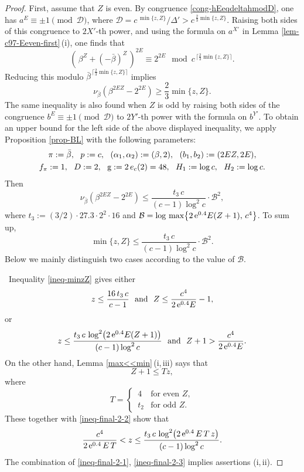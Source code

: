\documentclass[11pt]{amsart}
\numberwithin{equation}{section}
\begin{document}
\begin{proof}
First, assume that $Z$ is even.
By congruence \eqref{cong-hEeqdeltahmodD}, one has $a^E \equiv \pm1 \pmod{\mathcal D}$, where $\mathcal D=c^{\,\min\{z,Z\}}/\Delta'>c^{\,\frac{2}{3}\min\{z,Z\}}$.
Raising both sides of this congruence to $2X'$-th power, and using the formula on $a^{X'}$ in Lemma \ref{lem-c97-Eeven-first}\,(i), one finds that
\[
(\,\beta^Z+(-\bar{\beta})^Z\,)^{2E} \equiv 2^{2E} \mod{c^{\,\big\lceil\frac{2}{3}\min\{z,Z\}\big\rceil}}.
\]
Reducing this modulo $\bar{\beta}^{\,\big\lceil\frac{2}{3}\min\{z,Z\}\big\rceil}$ implies
\[
\nu_{\bar{\beta}} (\beta^{2EZ}-2^{2E}) \ge \frac{2}{3}\min\{z,Z\}.
\]
The same inequality is also found when $Z$ is odd by raising both sides of the congruence $b^E \equiv \pm1 \pmod{\mathcal D}$ to $2Y'$-th power with the formula on $b^{Y'}$.
To obtain an upper bound for the left side of the above displayed inequality, we apply Proposition \ref{prop-BL} with the following parameters:
\begin{gather*}
\pi:=\bar{\beta}, \ \ p:=c, \ \ (\alpha_1,\alpha_2):=(\beta,2), \ \ (b_1,b_2):=(2EZ,2E),\\
f_{\pi}:=1, \ \ D:=2, \ \ {\rm g}:=2\,e_{c}(2)=48, \ \ H_1:=\log c, \ \ H_2:=\log c.
\end{gather*}
Then
\[
\nu_{\bar{\beta}} (\beta^{2EZ}-2^{2E}) \le \frac{t_3 \,c}{(c-1)\log^2 c} \cdot \mathcal B^2,
\]
where $t_3:=(3/2) \cdot 27.3 \cdot 2^2 \cdot 16$ and $\mathcal B=\log\,\max \bigr\{ 2\,{\rm e}^{0.4}E(Z+1), \, c^4 \bigr\}$.
To sum up, %
\begin{equation}\label{ineq-minzZ}
\min\{z,Z\} \le \frac{t_3\,c}{(c-1)\log^2 c} \cdot \mathcal B^2.
\end{equation}
Below we mainly distinguish two cases according to the value of $\mathcal B$.

\vspace{0.1cm}{\it Case where $z \le Z.$} \
Inequality \eqref{ineq-minzZ} gives either
\begin{equation}\label{ineq-final-2-1}
z \le \frac{16\,t_3\,c}{c-1} \ \ \text{and} \ \   
Z \le \frac{c^4}{2\,{\rm e}^{0.4}E}-1,
\end{equation}
or
\begin{equation}\label{ineq-final-2-2}
z \le \frac{t_3 \,c\,\log^2 \bigr(2\,{\rm e}^{0.4}E(Z+1)\big)}{(c-1)\log^2 c} \ \ \text{and} \ \  Z+1>\frac{c^4}{2\,{\rm e}^{0.4}E}.
\end{equation}
On the other hand, Lemma \ref{max<<min}\,(i,\,iii) says that
\[ 
Z+1 \le T z, 
\]
where
\[
T=\begin{cases}
\, 4 & \text{for even $Z$}, \\
\, t_2 & \text{for odd $Z$}.
\end{cases}
\]
These together with \eqref{ineq-final-2-2} show that
\begin{equation}\label{ineq-final-2-3}
\frac{c^4}{2\,{\rm e}^{0.4}\,E\,T}< z \le \frac{t_3 \,c\,\log^2 \bigr(2\,{\rm e}^{0.4}\,E\,T\,z\big)}{(c-1)\log^2 c}.
\end{equation}
The combination of \eqref{ineq-final-2-1}, \eqref{ineq-final-2-3} implies assertions (i,\,ii).


\end{proof}
\end{document}
